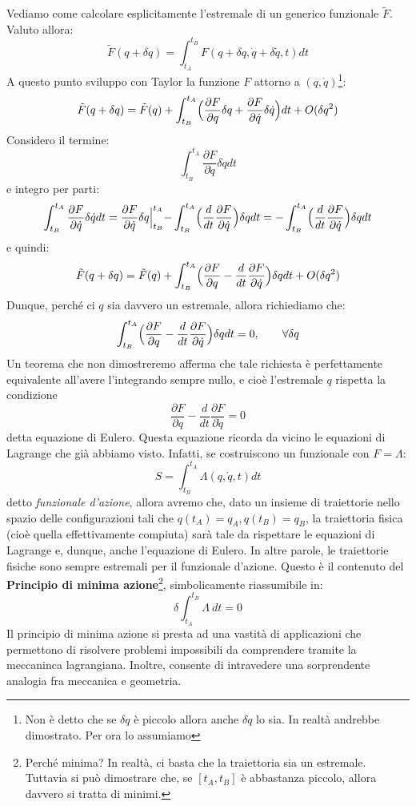 \documentclass[a4paper,openany]{article}
\begin{document}
	
	Vediamo come calcolare esplicitamente l'estremale di un generico funzionale $\tilde{F}$. Valuto allora:
	$$
	\tilde{F}(q+\delta q) = \int_{t_A}^{t_B}F(q+\delta q, \dot{q}+\delta \dot{q},t)dt
	$$
	A questo punto sviluppo con Taylor la funzione $F$ attorno a $(q,	\dot{q})$\footnote{Non è detto che se $\delta q $ è piccolo allora anche $\delta \dot{q}$ lo sia. In realtà andrebbe dimostrato. Per ora lo assumiamo}:
	$$
	\tilde{F}(q+\delta q) = \tilde{F} (q) + \int_{t_B}^{t_A}\Bigl(\dfrac{\partial F}{\partial q}\delta q+\dfrac{\partial F}{\partial \dot{q}}\delta \dot{q}\Bigl)dt + O(\delta q^2)
	$$
	Considero il termine:
	$$
	\int_{t_B}^{t_A}\dfrac{\partial F}{\partial \dot{q}}\delta \dot{q}dt
	$$
	e integro per parti:
	$$
	\int_{t_B}^{t_A}\dfrac{\partial F}{\partial \dot{q}}\delta \dot{q}dt = \dfrac{\partial F}{\partial \dot{q}}\delta q \Bigl|_{t_B}^{t_A} - \int_{t_B}^{t_A}\Bigl(\dfrac{d}{dt}\dfrac{\partial F}{\partial \dot{q}}\Bigl)\delta qdt = - \int_{t_B}^{t_A}\Bigl(\dfrac{d}{dt}\dfrac{\partial F}{\partial \dot{q}}\Bigl)\delta q dt
	$$
	e quindi:
	$$
	\tilde{F}(q+\delta q) = \tilde{F} (q) + \int_{t_B}^{t_A}\Bigl(\dfrac{\partial F}{\partial q}-\dfrac{d}{dt}\dfrac{\partial F}{\partial \dot{q}}\Bigl)\delta qdt + O(\delta q^2)
	$$
	Dunque, perché ci $q$ sia davvero un estremale, allora richiediamo che:
	$$
	\int_{t_B}^{t_A}\Bigl(\dfrac{\partial F}{\partial q}-\dfrac{d}{dt}\dfrac{\partial F}{\partial \dot{q}}\Bigl)\delta qdt = 0, \qquad \forall \delta q
	$$
	Un teorema che non dimostreremo afferma che tale richiesta è perfettamente equivalente all'avere l'integrando sempre nullo, e cioè l'estremale $q$ rispetta la condizione
	$$
	\dfrac{\partial F}{\partial q}-\dfrac{d}{dt}\dfrac{\partial F}{\partial \dot{q}} = 0
	$$
	detta equazione di Eulero. Questa equazione ricorda da vicino le equazioni di Lagrange che già abbiamo visto. Infatti, se costruiscono un funzionale con $F= \Lambda$:
	\begin{equation}\label{key}
		S = \int_{t_B}^{t_A} \Lambda(q,\dot{q},t) dt
	\end{equation}
	detto \textit{funzionale d'azione}, allora avremo che, dato un insieme di traiettorie nello spazio delle configurazioni tali che $q(t_A) = q_A, q(t_B) = q_B$, la traiettoria fisica (cioè quella effettivamente compiuta) sarà tale da rispettare le equazioni di Lagrange e, dunque, anche l'equazione di Eulero. In altre parole, le traiettorie fisiche sono sempre estremali per il funzionale d'azione. Questo è il contenuto del \textbf{Principio di minima azione}\footnote{Perché minima? In realtà, ci basta che la traiettoria sia un estremale. Tuttavia si può dimostrare che, se $[t_A, t_B]$ è abbastanza piccolo, allora davvero si tratta di minimi.}, simbolicamente riassumibile in:
	\begin{equation}\label{key}
		\delta \int_{t_A}^{t_B}\Lambda \> dt = 0
	\end{equation}
	Il principio di minima azione si presta ad una vastità di applicazioni che permettono di risolvere problemi impossibili da comprendere tramite la meccaninca lagrangiana. Inoltre, consente di intravedere una sorprendente analogia fra meccanica e geometria.
	
\end{document}
